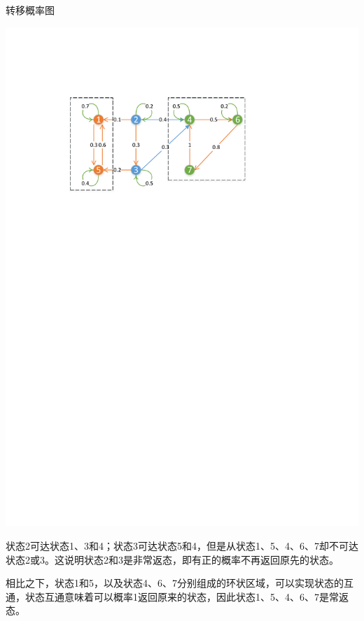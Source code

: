 \documentclass[t]{beamer}
\begin{document}
\begin{frame}{转移概率图}
    \begin{center}
		\includegraphics[scale=.6]{fig/markov2.pdf}
    \end{center}
    \begin{spacing}{1.2}
    \small
    状态2可达状态1、3和4；状态3可达状态5和4，但是从状态1、5、4、6、7却不可达状态2或3。这说明状态2和3是非常返态，即有正的概率不再返回原先的状态。

    相比之下，状态1和5，以及状态4、6、7分别组成的环状区域，可以实现状态的互通，状态互通意味着可以概率1返回原来的状态，因此状态1、5、4、6、7是常返态。
    \end{spacing}
\end{frame}
\end{document}
